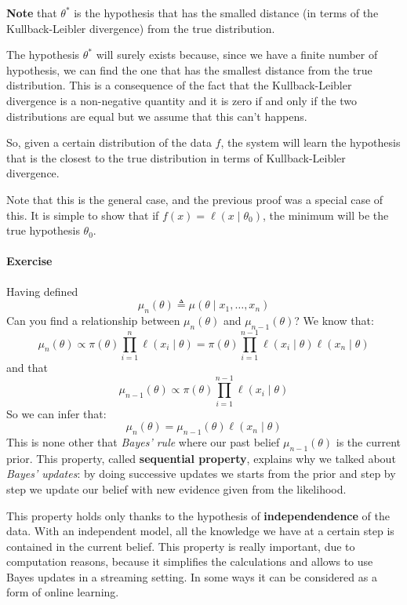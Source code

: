 \textbf{Note} that $\theta^{\ast} $ is the hypothesis that has the smalled distance (in terms of the Kullback-Leibler divergence) from the true distribution.

The hypothesis $\theta^\ast$ will surely exists because, since we have a finite number of hypothesis, we can find the one that has the smallest distance from the true distribution. This is a consequence of the fact that the Kullback-Leibler divergence is a non-negative quantity and it is zero if and only if the two distributions are equal but we assume that this can't happens.

So, given a certain distribution of the data $f$, the system will learn the hypothesis that is the closest to the true distribution in terms of Kullback-Leibler divergence.

Note that this is the general case, and the previous proof was a special case of this. It is simple to show that if $f(x) = \ell(x \mid \theta_0)$, the minimum will be the true hypothesis $\theta_0$.



\paragraph*{Exercise}
Having defined
\[
    \mu_n(\theta) \triangleq \mu(\theta \mid x_1, \dots, x_n)
\]
Can you find a relationship between $\mu_n(\theta)$ and $\mu_{n-1}(\theta)$?
We know that:
\[
    \mu_n(\theta) \propto \pi(\theta) \prod_{i=1}^n \ell(x_i \mid \theta) = \pi(\theta) \prod_{i=1}^{n-1} \ell(x_i \mid \theta) \ell(x_n \mid \theta)
\]
and that
\[
    \mu_{n-1}(\theta) \propto \pi(\theta) \prod_{i=1}^{n-1} \ell(x_i \mid \theta)
\]
So we can infer that:
\[
    \mu_n(\theta) = \mu_{n-1}(\theta) \ell(x_n \mid \theta)
\]
This is none other that \textit{Bayes' rule} where our past belief $\mu_{n-1}(\theta)$ is the current prior. This property, called \textbf{sequential property}, explains why we talked about \textit{Bayes' updates}: by doing successive updates we starts from the prior and step by step we update our belief with new evidence given from the likelihood.

This property holds only thanks to the hypothesis of \textbf{independendence} of the data. With an independent model, all the knowledge we have at a certain step is contained in the current belief. This property is really important, due to computation reasons, because it simplifies the calculations and allows to use Bayes updates in a streaming setting. In some ways it can be considered as a form of online learning.

